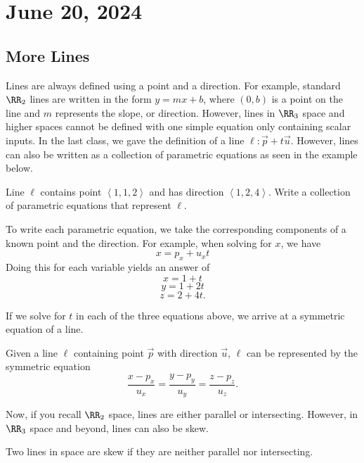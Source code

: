 \chapter{June 20, 2024}

\section{More Lines}

Lines are always defined using a point and a direction. For example, standard $\RR_{2}$ lines are written in the form $y = mx + b$, where $(0, b)$ is a point on the line and $m$ represents the slope, or direction. However, lines in $\RR_{3}$ space and higher spaces cannot be defined with one simple equation only containing scalar inputs. In the last class, we gave the definition of a line $\ell : \vec{p} + t\vec{u}$. However, lines can also be written as a collection of parametric equations as seen in the example below.

\begin{example}
    Line $\ell$ contains point $\left<1, 1, 2\right>$ and has direction $\left<1, 2, 4\right>$. Write a collection of parametric equations that represent $\ell$.

    \begin{soln}
        To write each parametric equation, we take the corresponding components of a known point and the direction. For example, when solving for $x$, we have
        \[x = p_{x} + u_{x}t\]
        Doing this for each variable yields an answer of
        \[x = 1 + t\]
        \[y = 1 + 2t\]
        \[z = 2 + 4t.\]
    \end{soln}
\end{example}

If we solve for $t$ in each of the three equations above, we arrive at a symmetric equation of a line.

\begin{corollary}
    Given a line $\ell$ containing point $\vec{p}$ with direction $\vec{u}$, $\ell$ can be represented by the symmetric equation
    \[\frac{x - p_{x}}{u_{x}} = \frac{y - p_{y}}{u_{y}} = \frac{z - p_{z}}{u_{z}}.\]
\end{corollary}

Now, if you recall $\RR_{2}$ space, lines are either parallel or intersecting. However, in $\RR_{3}$ space and beyond, lines can also be skew.

\begin{definition}
    Two lines in space are skew if they are neither parallel nor intersecting.
\end{definition}

